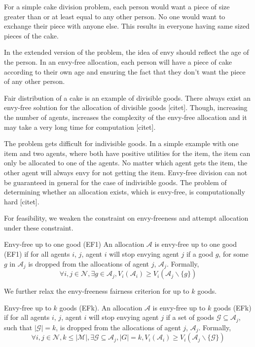 For a simple cake division problem, each person would want a piece of size greater than or at least equal to any other person. No one would want to exchange their piece with anyone else. This results in everyone having same sized pieces of the cake.

In the extended version of the problem, the idea of envy should reflect the age of the person. In an envy-free allocation, each person will have a piece of cake according to their own age and ensuring the fact that they don't want the piece of any other person. 

Fair distribution of a cake is an example of divisible goods. There always exist an envy-free solution for the allocation of divisible goods [citet]. Though, increasing the number of agents, increases the complexity of the envy-free allocation and it may take a very long time for computation [citet].

The problem gets difficult for indivisible goods. In a simple example with one item and two agents, where both have positive utilities for the item, the item can only be allocated to one of the agents. No matter which agent gets the item, the other agent will always envy for not getting the item. Envy-free division can not be guaranteed in general for the case of indivisible goods. The problem of determining whether an allocation exists, which is envy-free, is computationally hard [citet].

For feasibility, we weaken the constraint on envy-freeness and attempt allocation under these constraint.

\begin{definition}{Envy-free up to one good (EF1) \cite{caragiannis2016unreasonable}}
\label{def_ef1}
An allocation $\mathcal{A}$ is envy-free up to one good (EF1) if for all agents $i$, $j$, agent $i$ will stop envying agent $j$ if a good $g$, for some $g$ in $\mathcal{A}_j$ is dropped from the allocations of agent $j$, $\mathcal{A}_j$. Formally,
$$
    \forall i,j \in \mathcal{N}, \exists g \in \mathcal{A}_j, V_i(\mathcal{A}_i) \geq V_i(\mathcal{A}_j \backslash \{g\})
$$
\end{definition}

We further relax the envy-freeness fairness criterion for up to $k$ goods.

\begin{definition}{Envy-free up to $k$ goods (EFk).}
\label{def_efk}
An allocation $\mathcal{A}$ is envy-free up to $k$ goods (EFk) if for all agents $i$, $j$, agent $i$ will stop envying agent $j$ if a set of goods $\mathcal{G} \subseteq \mathcal{A}_j$, such that $|\mathcal{G}| = k$, is dropped from the allocations of agent $j$, $\mathcal{A}_j$. Formally,
$$
    \forall i,j \in \mathcal{N}, k \leq |\mathcal{M}|, \exists \mathcal{G} \subseteq \mathcal{A}_j, |G| = k, V_i(\mathcal{A}_i) \geq V_i(\mathcal{A}_j \backslash \{\mathcal{G}\})
$$
\end{definition}

